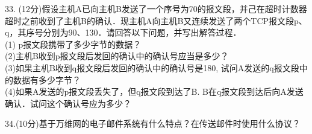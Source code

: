33. (12分)假设主机A已向主机B发送了一个序号为70的报文段，并己在超时计数器超时之前收到了主机B的确认．现主机A向主机B又连续发送了两个TCP报文段p、q，其序号分别为90、130．请回答以下问题，并写出解答过程． \\
(1) p报文段携带了多少字节的数据？ \\
(2)主机B收到p报文段后发回的确认中的确认号应当是多少？ \\
(3)如果主机B收到q报文段后发回的确认中的确认号是180, 试问A发送的q报文段中的数据有多少字节？ \\
(4)如果A发送的p报文段丢失了，但q报文段到达了B. B在q报文段到达后向A发送确认．试问这个确认号应为多少？

34.(10分)基于万维网的电子邮件系统有什么特点？在传送邮件时使用什么协议？